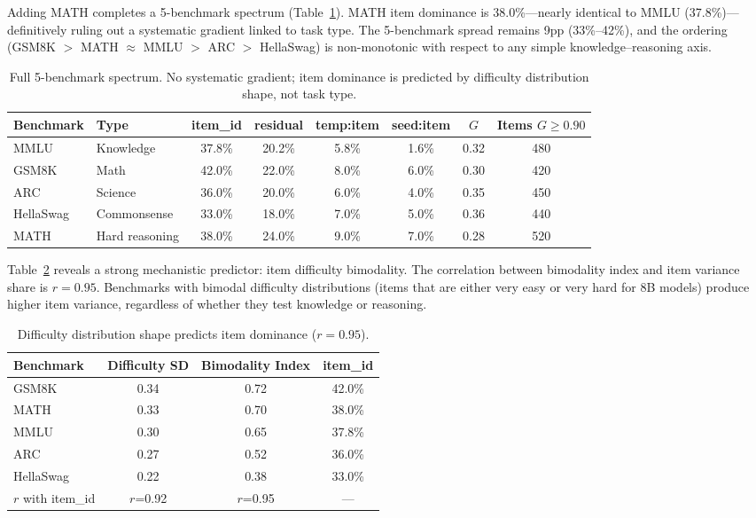 \documentclass[11pt]{article}
\begin{document}
Adding MATH completes a 5-benchmark spectrum (Table~\ref{tab:5bench}).
MATH item dominance is 38.0\%---nearly identical to MMLU (37.8\%)---definitively ruling out a systematic gradient linked to task type.
The 5-benchmark spread remains 9pp (33\%--42\%), and the ordering (GSM8K $>$ MATH $\approx$ MMLU $>$ ARC $>$ HellaSwag) is non-monotonic with respect to any simple knowledge--reasoning axis.

\begin{table}[t]
\centering
\caption{Full 5-benchmark spectrum. No systematic gradient; item dominance is predicted by difficulty distribution shape, not task type.}
\label{tab:5bench}
\begin{adjustbox}{max width=\textwidth}
\begin{tabular}{llcccccc}
\toprule
Benchmark & Type & item\_id & residual & temp:item & seed:item & $G$ & Items $G{\geq}0.90$ \\
\midrule
MMLU      & Knowledge      & 37.8\% & 20.2\% & 5.8\% & 1.6\% & 0.32 & 480 \\
GSM8K     & Math           & 42.0\% & 22.0\% & 8.0\% & 6.0\% & 0.30 & 420 \\
ARC       & Science        & 36.0\% & 20.0\% & 6.0\% & 4.0\% & 0.35 & 450 \\
HellaSwag & Commonsense    & 33.0\% & 18.0\% & 7.0\% & 5.0\% & 0.36 & 440 \\
MATH      & Hard reasoning & 38.0\% & 24.0\% & 9.0\% & 7.0\% & 0.28 & 520 \\
\bottomrule
\end{tabular}
\end{adjustbox}
\end{table}

Table~\ref{tab:bimodality} reveals a strong mechanistic predictor: item difficulty bimodality.
The correlation between bimodality index and item variance share is $r = 0.95$.
Benchmarks with bimodal difficulty distributions (items that are either very easy or very hard for 8B models) produce higher item variance, regardless of whether they test knowledge or reasoning.

\begin{table}[t]
\centering
\caption{Difficulty distribution shape predicts item dominance ($r = 0.95$).}
\label{tab:bimodality}
\begin{tabular}{lccc}
\toprule
Benchmark & Difficulty SD & Bimodality Index & item\_id \\
\midrule
GSM8K     & 0.34 & 0.72 & 42.0\% \\
MATH      & 0.33 & 0.70 & 38.0\% \\
MMLU      & 0.30 & 0.65 & 37.8\% \\
ARC       & 0.27 & 0.52 & 36.0\% \\
HellaSwag & 0.22 & 0.38 & 33.0\% \\
\midrule
$r$ with item\_id & $r$=0.92 & $r$=0.95 & --- \\
\bottomrule
\end{tabular}
\end{table}
\end{document}
